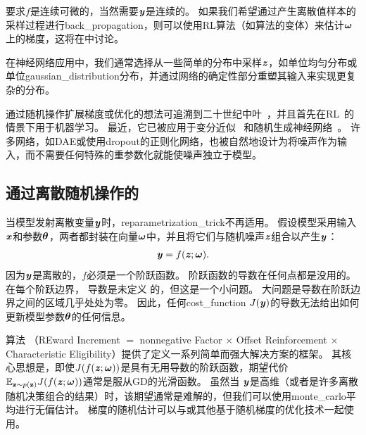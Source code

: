 要求$f$是连续可微的，当然需要$\boldsymbol{\mathit{y}}$是连续的。
如果我们希望通过产生离散值样本的采样过程进行\gls{back_propagation}，则可以使用\gls{RL}算法（如算法\citep{Williams-1992}的变体）来估计$\boldsymbol{\omega}$上的梯度，这将在中讨论。

在神经网络应用中，我们通常选择从一些简单的分布中采样$\boldsymbol{\mathit{z}}$，如单位均匀分布或单位\gls{gaussian_distribution}分布，并通过网络的确定性部分重塑其输入来实现更复杂的分布。

通过随机操作扩展梯度或优化的想法可追溯到二十世纪中叶~\citep{Price-1958,Bonnet-1964}，并且首先在\gls{RL}~\citep{Williams-1992}的情景下用于机器学习。
最近，它已被应用于变分近似~\citep{Opper+Archambeau-2009} 和随机生成神经网络~\citep{bengio2013estimating,Kingma-arxiv2013,Kingma+Welling-arxiv2014,Kingma+Welling-ICLR2014,Rezende-et-al-ICML2014,Goodfellow-et-al-NIPS2014-small}。
许多网络，如\gls{DAE}或使用\gls{dropout}的正则化网络，也被自然地设计为将噪声作为输入，而不需要任何特殊的重参数化就能使噪声独立于模型。


\subsection{通过离散随机操作的}
\label{sec:back_propagating_through_discrete_stochastic_operations}

当模型发射离散变量$\boldsymbol{\mathit{y}}$时，\gls{reparametrization_trick}不再适用。
假设模型采用输入$\boldsymbol{\mathit{x}}$和参数$\boldsymbol{\theta}$，两者都封装在向量$\boldsymbol{\omega}$中，并且将它们与随机噪声$\boldsymbol{\mathit{z}}$组合以产生$\boldsymbol{\mathit{y}}$：
\begin{align}
 \boldsymbol{\mathit{y}} = f(\boldsymbol{\mathit{z}};\boldsymbol{\omega}).
\end{align}
因为$\boldsymbol{\mathit{y}}$是离散的，$f$必须是一个阶跃函数。
阶跃函数的导数在任何点都是没用的。
在每个阶跃边界， 导数是未定义 的，但这是一个小问题。
大问题是导数在阶跃边界之间的区域几乎处处为零。
因此，任何\gls{cost_function} $J(\boldsymbol{\mathit{y}})$的导数无法给出如何更新模型参数$\boldsymbol{\theta}$的任何信息。

算法 （REward Increment $=$ nonnegative Factor $\times$ Offset Reinforcement $\times$ Characteristic Eligibility）提供了定义一系列简单而强大解决方案的框架\citep{Williams-1992}。
其核心思想是，即使$J(f(\boldsymbol{\mathit{z}};\boldsymbol{\omega}))$是具有无用导数的阶跃函数，期望代价$\mathbb{E}_{\mathbf{z} \sim p(\mathbf{z})} J(f(\boldsymbol{\mathit{z}};\boldsymbol{\omega}))$通常是服从\gls{GD}的光滑函数。
虽然当 $\boldsymbol{\mathit{y}}$是高维（或者是许多离散随机决策组合的结果）时，该期望通常是难解的，但我们可以使用\gls{monte_carlo}平均进行无偏估计。
梯度的随机估计可以与或其他基于随机梯度的优化技术一起使用。

